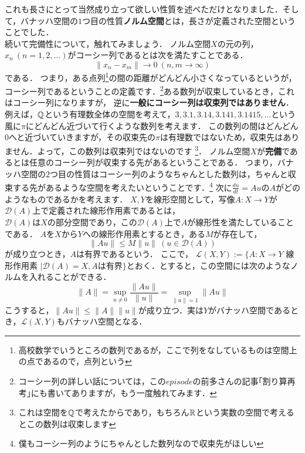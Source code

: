 これも長さにとって当然成り立って欲しい性質を述べただけとなりました．そして，バナッハ空間の$1$つ目の性質\textbf{ノルム空間}とは，長さが定義された空間ということでした．\\
続いて完備性について，触れてみましょう．
ノルム空間$X$の元の列，$x_n \ (n=1,2,\dotsc)$がコーシー列であるとは次を満たすことである．
\[
\| x_n - x_m \| \to 0 \ (n,m \to \infty)
\]
である．
つまり，ある点列\footnote{高校数学でいうところの数列であるが，ここで列をなしているものは空間上の点であるので，点列という}の間の距離がどんどん小さくなっているというが，コーシー列であるということの定義です．\footnote{コーシー列の詳しい話については，この$episode$の前多さんの記事｢割り算再考｣にも書いてありますが，もう一度触れてみます．}ある数列が収束しているとき，これはコーシー列になりますが，
逆に\textbf{一般にコーシー列は収束列ではありません}．例えば，$\mathbb Q$という有理数全体の空間を考えて，$3,3.1,3.14,3.141,3.1415,\dotsc$という風に$\pi$にどんどん近づいて行くような数列を考えます．
この数列の間はどんどん$0$へと近づいていきますが，その収束先の$\pi$は有理数ではないため，収束先はありません．よって，この数列は収束列ではないのです
\footnote{これは空間を$\mathbb Q$で考えたからであり，もちろん$\mathbb R$という実数の空間で考えるとこの数列は収束します}．
ノルム空間$X$が\textbf{完備}であるとは任意のコーシー列が収束する先があるということである．
つまり，バナッハ空間の$2$つ目の性質はコーシー列のようなちゃんとした数列は，ちゃんと収束する先があるような空間を考えたいということです．\footnote{僕もコーシー列のようにちゃんとした数列なので収束先がほしい}
次に$\frac{du}{dt} = Au$の$A$がどのようなものであるかを考えます．
$X,Y$を線形空間として，写像$A:X\to Y$が$\mathcal{D}(A)$上で定義された線形作用素であるとは，\\
$\mathcal{D}(A)$は$X$の部分空間であり，この$\mathcal{D}(A)$上で$A$が線形性を満たしていることである．
{}
$A$を$X$から$Y$への線形作用素とするとき，ある$M$が存在して，
\[
\| Au \| \le M \| u \| \ (u \in \mathcal{D}(A))
\]
が成り立つとき，$A$は有界であるという．
ここで，
$\mathcal{L}(X,Y):= \{ A:X\to Y$ 線形作用素 $\mid \mathcal{D}(A)= X , A$は有界$ \}$とおく．とすると，この空間には次のようなノルムを入れることができる．
\[\| A \| = \sup_{u\neq 0}\frac{\|Au\|}{\|u\|} = \sup_{\| u \| = 1} \|Au\|\]
こうすると，$\|Au\| \le \|A\|\|u\|$が成り立つ．実は$Y$がバナッハ空間であるとき，$\mathcal{L}(X,Y)$もバナッハ空間となる．

